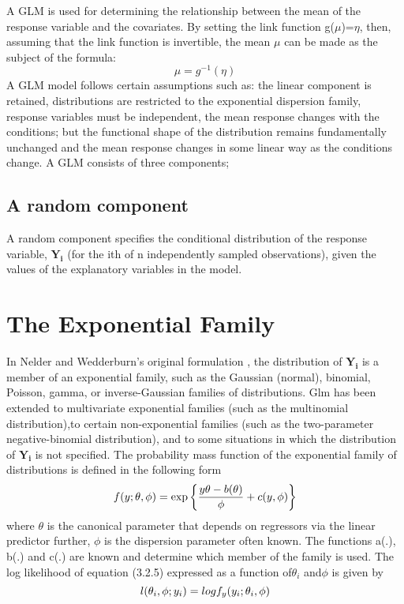 A GLM is used for determining the relationship between the mean of the response variable and the covariates. By setting the link function g($\mu$)=$\eta$, then, assuming that the link function is invertible, the mean $\mu$ can be made as the subject of the formula:
\begin{equation}
	\mu=g^{-1}(\eta)
\end{equation}
A GLM model follows certain assumptions such as: the linear component is retained, distributions are restricted to the exponential dispersion family, response variables must be independent, the mean response changes with the conditions; but the functional shape of the distribution remains fundamentally unchanged and the mean response changes in some linear way as the conditions change.
A GLM consists of three components;
\subsection{A random component}
A random component specifies the conditional distribution of the response variable, $\bm{Y_i}$ (for the ith of n independently sampled observations), given the values of the explanatory variables in the model.
\section*{The Exponential Family}
 In Nelder and Wedderburn’s original formulation \citep{nelder1972generalized}, the distribution of $\bm{Y_i}$ is a member of an exponential family, such as the Gaussian (normal), binomial, Poisson, gamma, or inverse-Gaussian families of distributions. Glm has been extended to multivariate exponential families (such as the multinomial distribution),to certain non-exponential families (such as the two-parameter negative-binomial distribution), and to some situations in which the distribution of $\bm{Y_i}$ is not specified.
The probability mass function of the exponential family of distributions is defined in the following form
\begin{equation}
	\centering
	\label{eqn:exp}
	f(y;\theta,\phi) = 
	\exp\left\{ \frac{y\theta-b(\theta)}{\phi} + c(y,\phi)\right\}
\end{equation}
where $\theta$ is the canonical parameter that depends on regressors via the linear predictor further, $\phi$ is the dispersion parameter often known. The functions a(.), b(.) and c(.) are known and determine which member of the family is used.
The log likelihood of equation (3.2.5) expressed as a function of$\theta_i$ and$\phi$ is given by
\begin{equation}
	\centering
	l(\theta_i,\phi;y_i)= logf_y(y_i;\theta_i,\phi) 
\end{equation}

